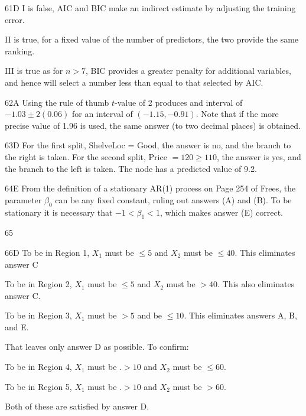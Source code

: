 \begin{solution}{61}{D}
I is false, AIC and BIC make an indirect estimate by adjusting the training error.

II is true, for a fixed value of the number of predictors, the two provide the same ranking.

III is true as for $n > 7$, BIC provides a greater penalty for additional variables, and hence will select a number less than equal to that selected by AIC.
\end{solution}

\begin{solution}{62}{A}
Using the rule of thumb $t$-value of 2 produces and interval of $-1.03 \pm 2(0.06)$ for an interval of $(-1.15, -0.91)$. Note that if the more precise value of 1.96 is used, the same answer (to two decimal places) is obtained.
\end{solution}

\begin{solution}{63}{D}
For the first split, ShelveLoc = Good, the answer is no, and the branch to the right is taken. For the second split, Price $= 120 \geqslant 110$, the answer is yes, and the branch to the left is taken. The node has a predicted value of 9.2.
\end{solution}

\begin{solution}{64}{E}
From the definition of a stationary AR(1) process on Page 254 of Frees, the parameter $\beta_0$ can be any fixed constant, ruling out answers (A) and (B). To be stationary it is necessary that $-1 < \beta_1 < 1$, which makes answer (E) correct.
\end{solution}

\begin{solution}{65}{}
\deleted
\end{solution}

\begin{solution}{66}{D}
To be in Region 1, $X_1$ must be $\leqslant 5$ and $X_2$ must be $\leqslant 40$. This eliminates answer C

To be in Region 2, $X_1$ must be $\leqslant 5$ and $X_2$ must be $> 40$. This also eliminates answer C.

To be in Region 3, $X_1$ must be $> 5$ and be $\leqslant 10$. This eliminates answers A, B, and E.

That leaves only answer D as possible. To confirm:

To be in Region 4, $X_1$ must be .$> 10$ and $X_2$ must be $\leqslant 60$.

To be in Region 5, $X_1$ must be .$> 10$ and $X_2$ must be $> 60$.

Both of these are satisfied by answer D.
\end{solution}

